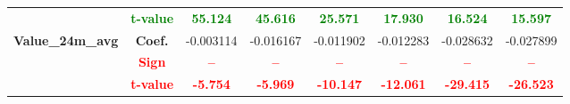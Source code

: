 \documentclass[11pt,english,a4paper,hidelinks]{book}
\begin{document}
\begin{table}[H]
\begin{tabular}{lccccccc}
            & \textbf{\textcolor{green}{t-value}} & \textbf{\textcolor{green}{55.124}}    & \textbf{\textcolor{green}{45.616}}    & \textbf{\textcolor{green}{25.571}}    & \textbf{\textcolor{green}{17.930}}    & \textbf{\textcolor{green}{16.524}}    & \textbf{\textcolor{green}{15.597}}    \\
        \multirow{3}{*}{\textbf{Value\_24m\_avg}} 
            & \textbf{Coef.}   & -0.003114 & -0.016167 & -0.011902 & -0.012283 & -0.028632 & -0.027899 \\
            & \textbf{\textcolor{red}{Sign}}    & \textbf{\textcolor{red}{–}}         & \textbf{\textcolor{red}{–}}         & \textbf{\textcolor{red}{–}}         & \textbf{\textcolor{red}{–}}         & \textbf{\textcolor{red}{–}}         & \textbf{\textcolor{red}{–}}         \\
            & \textbf{\textcolor{red}{t-value}} & \textbf{\textcolor{red}{-5.754}}    & \textbf{\textcolor{red}{-5.969}}    & \textbf{\textcolor{red}{-10.147}}   & \textbf{\textcolor{red}{-12.061}}   & \textbf{\textcolor{red}{-29.415}}   & \textbf{\textcolor{red}{-26.523}}   \\
        \bottomrule
    \end{tabular}
    \label{tab:north_america_windowed_consistency_summary}
\end{table}
\end{document}

